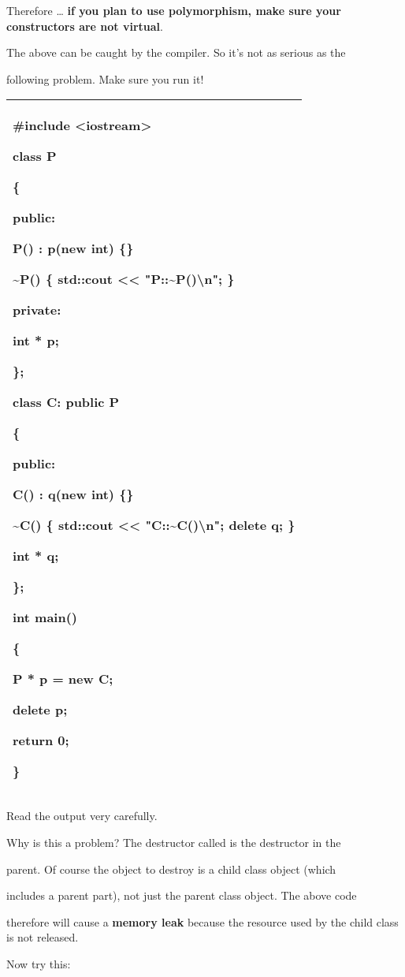 \documentclass[
]{article}
\begin{document}
Therefore \ldots{} \textbf{if you plan to use polymorphism, make sure
your constructors are not virtual}.

The above can be caught by the compiler. So it's not as serious as the

following problem. Make sure you run it!

\begin{longtable}[]{@{}l@{}}
\toprule
\endhead
\begin{minipage}[t]{0.97\columnwidth}\raggedright
\#include \textless iostream\textgreater{}

class P

\{

public:

P() : p(new int) \{\}

\textasciitilde P() \{ std::cout \textless\textless{}
"P::\textasciitilde P()\textbackslash n"; \}

private:

int * p;

\};

class C: public P

\{

public:

C() : q(new int) \{\}

\textasciitilde C() \{ std::cout \textless\textless{}
"C::\textasciitilde C()\textbackslash n"; delete q; \}

int * q;

\};

int main()

\{

P * p = new C;

delete p;

return 0;

\}\strut
\end{minipage}\tabularnewline
\bottomrule
\end{longtable}

Read the output very carefully.

Why is this a problem? The destructor called is the destructor in the

parent. Of course the object to destroy is a child class object (which

includes a parent part), not just the parent class object. The above
code

therefore will cause a \textbf{memory leak }because the resource used by
the child class is not released.

Now try this:
\end{document}
